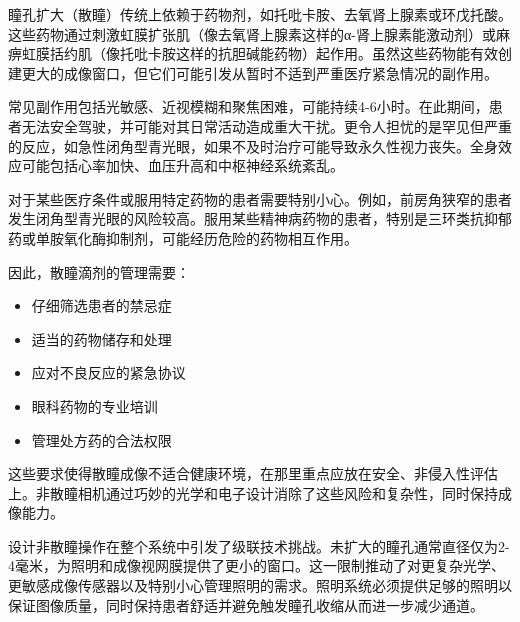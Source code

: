 \documentclass[
  Letterpaper,
]{scrbook}
\providecommand{\tightlist}{%
  \setlength{\itemsep}{0pt}\setlength{\parskip}{0pt}}\usepackage{longtable,booktabs,array}
\begin{document}
\begin{tcolorbox}[enhanced jigsaw, coltitle=black, rightrule=.15mm, colback=white, colbacktitle=quarto-callout-note-color!10!white, breakable, bottomtitle=1mm, opacityback=0, bottomrule=.15mm, titlerule=0mm, opacitybacktitle=0.6, left=2mm, colframe=quarto-callout-note-color-frame, title=\textcolor{quarto-callout-note-color}{\faInfo}\hspace{0.5em}{为什么非散瞳操作至关重要？}, toptitle=1mm, toprule=.15mm, arc=.35mm, leftrule=.75mm]

瞳孔扩大（散瞳）传统上依赖于药物剂，如托吡卡胺、去氧肾上腺素或环戊托酸。这些药物通过刺激虹膜扩张肌（像去氧肾上腺素这样的α-肾上腺素能激动剂）或麻痹虹膜括约肌（像托吡卡胺这样的抗胆碱能药物）起作用。虽然这些药物能有效创建更大的成像窗口，但它们可能引发从暂时不适到严重医疗紧急情况的副作用。\newline{}

常见副作用包括光敏感、近视模糊和聚焦困难，可能持续4-6小时。在此期间，患者无法安全驾驶，并可能对其日常活动造成重大干扰。更令人担忧的是罕见但严重的反应，如急性闭角型青光眼，如果不及时治疗可能导致永久性视力丧失。全身效应可能包括心率加快、血压升高和中枢神经系统紊乱。\newline{}

对于某些医疗条件或服用特定药物的患者需要特别小心。例如，前房角狭窄的患者发生闭角型青光眼的风险较高。服用某些精神病药物的患者，特别是三环类抗抑郁药或单胺氧化酶抑制剂，可能经历危险的药物相互作用。\newline{}

因此，散瞳滴剂的管理需要：

\begin{itemize}
\tightlist
\item
  仔细筛选患者的禁忌症
\item
  适当的药物储存和处理
\item
  应对不良反应的紧急协议
\item
  眼科药物的专业培训
\item
  管理处方药的合法权限
\end{itemize}

这些要求使得散瞳成像不适合健康环境，在那里重点应放在安全、非侵入性评估上。非散瞳相机通过巧妙的光学和电子设计消除了这些风险和复杂性，同时保持成像能力。

\end{tcolorbox}

设计非散瞳操作在整个系统中引发了级联技术挑战。未扩大的瞳孔通常直径仅为2-4毫米，为照明和成像视网膜提供了更小的窗口。这一限制推动了对更复杂光学、更敏感成像传感器以及特别小心管理照明的需求。照明系统必须提供足够的照明以保证图像质量，同时保持患者舒适并避免触发瞳孔收缩从而进一步减少通道。
\end{document}
